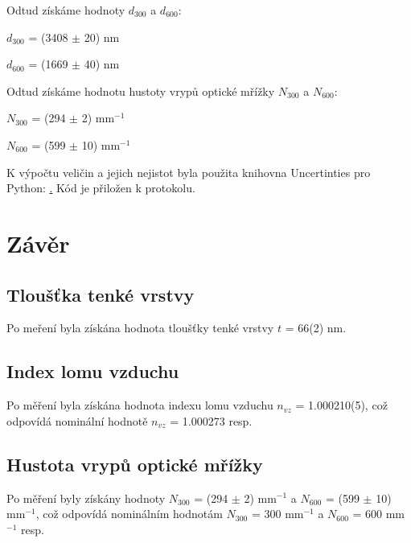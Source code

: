 \documentclass[a4paper,11pt]{article}
\begin{document}
    \begin{minipage}[t]{0.5\textwidth}
                Odtud získáme hodnoty $d_{300}$ a $d_{600}$:
                \begin{center}
                    $d_{300}$ = (3408 $\pm$ 20) nm
                    \vspace{5pt}
                    \par $d_{600}$ = (1669 $\pm$ 40) nm
                \end{center}
                \par Odtud získáme hodnotu hustoty vrypů optické mřížky $N_{300}$ a $N_{600}$:
                \begin{center}
                    $N_{300}$ = (294 $\pm$ 2) mm$^{-1}$
                    \vspace{5pt}
                    \par $N_{600}$ = (599 $\pm$ 10) mm$^{-1}$
                \end{center}
                \par K výpočtu veličin a jejich nejistot byla použita knihovna Uncertinties pro Python: \href{pypi.org/project/uncertainties}. Kód je přiložen k protokolu. 
        \section{Závěr}  
            \subsection{Tloušťka tenké vrstvy}
                Po meření byla získána hodnota tloušťky tenké vrstvy $t$ = 66(2) nm.
            \subsection{Index lomu vzduchu}
                Po měření byla získána hodnota indexu lomu vzduchu $n_{vz}$ = 1.000210(5), což odpovídá nominální hodnotě $n_{vz}$ = 1.000273 resp.
            \subsection{Hustota vrypů optické mřížky}
                Po měření byly získány hodnoty $N_{300}$ = (294 $\pm$ 2) mm$^{-1}$ a $N_{600}$ = (599 $\pm$ 10) mm$^{-1}$, což odpovídá nominálním hodnotám $N_{300}$ = 300 mm$^{-1}$ a $N_{600}$ = 600 mm$^{-1}$ resp.
    \end{minipage}
    \hspace{10pt}  
    \begin{minipage}[t]{0.5\textwidth} 
    \end{minipage}
\end{document}

